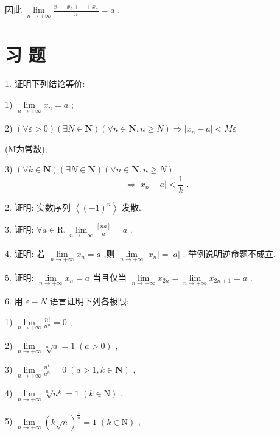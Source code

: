 因此 $\mathop{\lim }\limits_{{n \rightarrow   + \infty }}\frac{{x}_{1} + {x}_{2} + \cdots  + {x}_{n}}{n} = a$ .

\section*{习 题}

1. 证明下列结论等价:

1) $\mathop{\lim }\limits_{{n \rightarrow   + \infty }}{x}_{n} = a$ ;

2) $\left( {\forall \varepsilon  > 0}\right) \left( {\exists N \in  \mathbf{N}}\right) \left( {\forall n \in  \mathbf{N},n \geq  N}\right)  \Rightarrow  \left| {{x}_{n} - a}\right|  < {M\varepsilon }$

(M为常数);

3) $\left( {\forall k \in  \mathbf{N}}\right) \left( {\exists N \in  \mathbf{N}}\right) \left( {\forall n \in  \mathbf{N},n \geq  N}\right)$
$$\Rightarrow  \left| {{x}_{n} - a}\right|  < \frac{1}{k}\text{ . }$$

2. 证明: 实数序列 $\left\langle  {\left( -1\right) }^{n}\right\rangle$ 发散.

3. 证明: $\forall a \in  \mathrm{R},\mathop{\lim }\limits_{{n \rightarrow   + \infty }}\frac{\left\lbrack  na\right\rbrack  }{n} = a$ .

4. 证明: 若 $\mathop{\lim }\limits_{{n \rightarrow   + \infty }}{x}_{n} = a$ ,则 $\mathop{\lim }\limits_{{n \rightarrow   + \infty }}\left| {x}_{n}\right|  = \left| a\right|$ . 举例说明逆命题不成立.

5. 证明: $\mathop{\lim }\limits_{{n \rightarrow   + \infty }}{x}_{n} = a$ 当且仅当 $\mathop{\lim }\limits_{{n \rightarrow   + \infty }}{x}_{2n} = \mathop{\lim }\limits_{{n \rightarrow   + \infty }}{x}_{{2n} + 1} = a$ .

6. 用 $\varepsilon  - N$ 语言证明下列各极限:

1) $\mathop{\lim }\limits_{{n \rightarrow   + \infty }}\frac{n!}{{n}^{n}} = 0$ ,

2) $\mathop{\lim }\limits_{{n \rightarrow   + \infty }}\sqrt[n]{a} = 1\;\left( {a > 0}\right)$ ,

3) $\mathop{\lim }\limits_{{n \rightarrow   + \infty }}\frac{{n}^{k}}{{a}^{n}} = 0\;\left( {a > 1,k \in  \mathbf{N}}\right)$ ,

4) $\mathop{\lim }\limits_{{n \rightarrow   + \infty }}\sqrt[n]{{n}^{k}} = 1\;\left( {k \in  \mathrm{N}}\right)$ ,

5) $\mathop{\lim }\limits_{{n \rightarrow   + \infty }}{\left( k\sqrt{n}\right) }^{\frac{1}{n}} = 1\;\left( {k \in  \mathrm{N}}\right)$ ,

